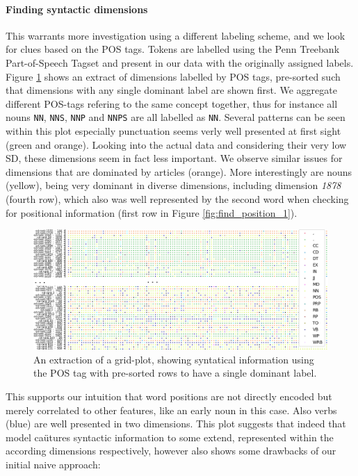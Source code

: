\paragraph*{Finding syntactic dimensions}
This warrants more investigation using a different labeling scheme, and we look for clues based on the \ac{POS} tags. Tokens are labelled using the Penn Treebank Part-of-Speech Tagset \citep{marcus1993building} and present in our data with the originally assigned labels. Figure \ref{fig:find_syntax} shows an extract of dimensions labelled by \ac{POS} tags, pre-sorted such that dimensions with any single dominant label are shown first. We aggregate different \ac{POS}-tags refering to the same concept together, thus for instance all nouns \texttt{NN}, \texttt{NNS}, \texttt{NNP} and \texttt{NNPS} are all labelled as \texttt{NN}. Several patterns can be seen within this plot especially punctuation seems verly well presented at first sight (green and orange). Looking into the actual data and considering their very low \ac{SD}, these dimensions seem in fact less important. We observe similar issues for dimensions that are dominated by articles (orange). More interestingly are nouns (yellow), being very dominant in diverse dimensions, including dimension \textit{1878} (fourth row), which also was well represented by the second word when checking for positional information (first row in Figure \ref{fig:find_position_1}). 
\begin{figure}[tph!]
\centering
	\includegraphics[totalheight=7cm]{fig/finsynpos3.png}
	\caption{An extraction of a grid-plot, showing syntatical information using the \ac{POS} tag with pre-sorted rows to have a single dominant label.}
	\label{fig:find_syntax}
\end{figure}
\noindent
This supports our intuition that word positions are not directly encoded but merely correlated to other features, like an early noun in this case. Also verbs (blue) are well presented in two dimensions. This plot suggests that indeed that model caütures syntactic information to some extend, represented within the according dimensions respectively, however also shows some drawbacks of our initial naive approach:
